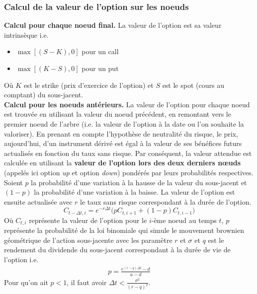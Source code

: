\documentclass[a4paper]{article}
\begin{document}
 \subsubsection{Calcul de la valeur de l'option sur les noeuds}
 \textbf{Calcul pour chaque noeud final.} La valeur de l'option est sa valeur intrinsèque i.e.
 \begin{itemize}
     \item $\max[ (S-K), 0]$ pour un call 
     \item $\max[ (K-S), 0]$ pour un put
 \end{itemize}
 Où $K$ est le strike (prix d'exercice de l'option) et $S$ est le spot (cours au comptant) du sous-jacent.
 \hspace{2mm} \\
 \textbf{Calcul pour les noeuds antérieurs.} La valeur de l'option pour chaque noeud est trouvée en utilisant la valeur du noeud précédent, en remontant vers le premier noeud de l'arbre (i.e. la valeur de l'option à la date ou l'on souhaite la valoriser).
\vspace{2mm}
     En prenant en compte l’hypothèse de neutralité du risque, le prix, aujourd’hui, d’un instrument dérivé est égal à la valeur de ses bénéfices futurs actualisés en fonction du taux sans risque. Par conséquent, la valeur attendue est calculée en utilisant la \textbf{valeur de l’option lors des deux derniers nœuds} (appelés ici option \textit{up} et option \textit{down}) pondérés par leurs probabilités respectives. Soient $p$ la probabilité d’une variation à la hausse de la valeur du sous-jacent et $(1-p)$ la probabilité d’une variation à la baisse. La valeur de l’option est ensuite actualisée avec $r$ le taux sans risque correspondant à la durée de l’option.
     \begin{equation}
         C_{t-\Delta t,i} = e^{-r\Delta t} \bigg( pC_{t,i+1} + (1-p)C_{t, i-1} \bigg)
     \end{equation}
     Où $C_{t,i}$ représente la valeur de l'option pour le $i$-ème noeud au temps $t$, $p$ représente la probabilité de la loi binomiale qui simule le mouvement brownien géométrique de l'action sous-jacente avec les paramètre $r$ et $\sigma$ et $q$ est le rendement du dividende du sous-jacent correspondant à la durée de vie de l’option i.e.
     \begin{align*}
         p = \frac{e^{(r-q)\Delta t}-d}{u-d} 
     \end{align*}
     Pour qu'on ait $p<1$, il faut avoir $\Delta t < \frac{\sigma ^2}{(r-q)^2}$. \\
\end{document}
